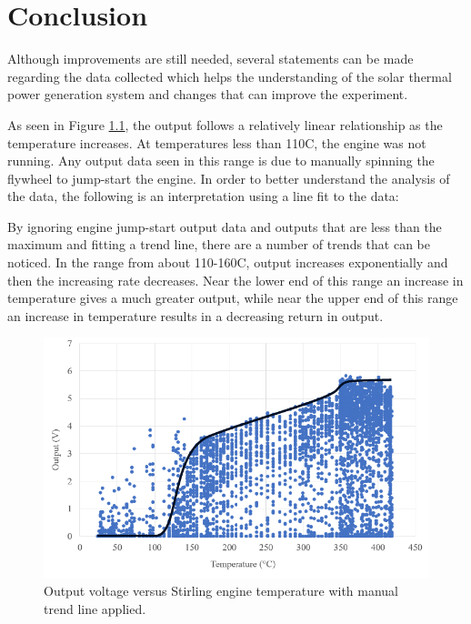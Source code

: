 \chapter{Conclusion}

Although improvements are still needed, several statements can be made regarding the data collected which helps the understanding of the solar thermal power generation system and changes that can improve the experiment.
    
As seen in Figure \ref{fig:trend}, the output follows a relatively linear relationship as the temperature increases. At temperatures less than 110\degree C, the engine was not running. Any output data seen in this range is due to manually spinning the flywheel to jump-start the engine. In order to better understand the analysis of the data, the following is an interpretation using a line fit to the data:

By ignoring engine jump-start output data and outputs that are less than the maximum and fitting a trend line, there are a number of trends that can be noticed. In the range from about 110-160\degree C, output increases exponentially and then the increasing rate decreases. Near the lower end of this range an increase in temperature gives a much greater output, while near the upper end of this range an increase in temperature results in a decreasing return in output.

\begin{figure}[H]
    \centering
    \includegraphics[width=\textwidth]{diagrams/data3trend}
    \caption[Data with trend line interpretation]{Output voltage versus Stirling engine temperature with manual trend line applied.}
    \label{fig:trend}
\end{figure}

